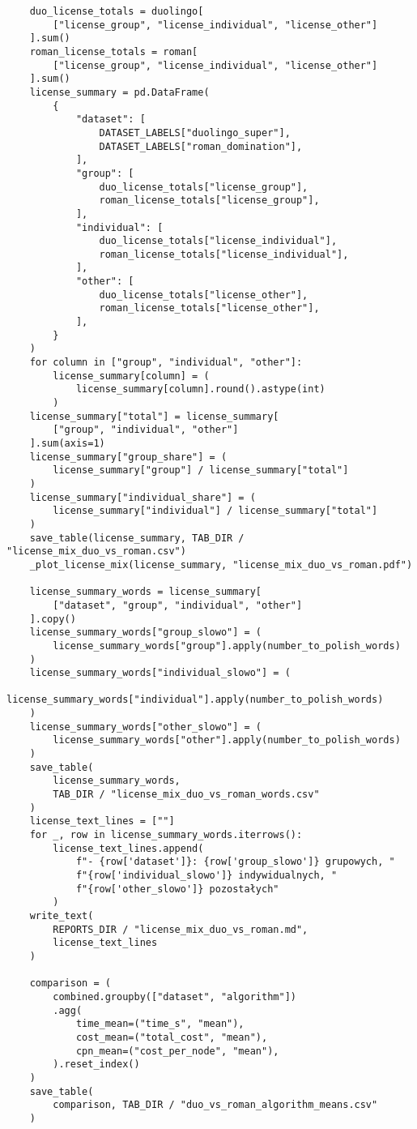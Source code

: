 \begin{verbatim}
    duo_license_totals = duolingo[
        ["license_group", "license_individual", "license_other"]
    ].sum()
    roman_license_totals = roman[
        ["license_group", "license_individual", "license_other"]
    ].sum()
    license_summary = pd.DataFrame(
        {
            "dataset": [
                DATASET_LABELS["duolingo_super"],
                DATASET_LABELS["roman_domination"],
            ],
            "group": [
                duo_license_totals["license_group"],
                roman_license_totals["license_group"],
            ],
            "individual": [
                duo_license_totals["license_individual"],
                roman_license_totals["license_individual"],
            ],
            "other": [
                duo_license_totals["license_other"],
                roman_license_totals["license_other"],
            ],
        }
    )
    for column in ["group", "individual", "other"]:
        license_summary[column] = (
            license_summary[column].round().astype(int)
        )
    license_summary["total"] = license_summary[
        ["group", "individual", "other"]
    ].sum(axis=1)
    license_summary["group_share"] = (
        license_summary["group"] / license_summary["total"]
    )
    license_summary["individual_share"] = (
        license_summary["individual"] / license_summary["total"]
    )
    save_table(license_summary, TAB_DIR / "license_mix_duo_vs_roman.csv")
    _plot_license_mix(license_summary, "license_mix_duo_vs_roman.pdf")

    license_summary_words = license_summary[
        ["dataset", "group", "individual", "other"]
    ].copy()
    license_summary_words["group_slowo"] = (
        license_summary_words["group"].apply(number_to_polish_words)
    )
    license_summary_words["individual_slowo"] = (
        license_summary_words["individual"].apply(number_to_polish_words)
    )
    license_summary_words["other_slowo"] = (
        license_summary_words["other"].apply(number_to_polish_words)
    )
    save_table(
        license_summary_words,
        TAB_DIR / "license_mix_duo_vs_roman_words.csv"
    )
    license_text_lines = [""]
    for _, row in license_summary_words.iterrows():
        license_text_lines.append(
            f"- {row['dataset']}: {row['group_slowo']} grupowych, "
            f"{row['individual_slowo']} indywidualnych, "
            f"{row['other_slowo']} pozostałych"
        )
    write_text(
        REPORTS_DIR / "license_mix_duo_vs_roman.md",
        license_text_lines
    )

    comparison = (
        combined.groupby(["dataset", "algorithm"])
        .agg(
            time_mean=("time_s", "mean"),
            cost_mean=("total_cost", "mean"),
            cpn_mean=("cost_per_node", "mean"),
        ).reset_index()
    )
    save_table(
        comparison, TAB_DIR / "duo_vs_roman_algorithm_means.csv"
    )


\end{verbatim}
